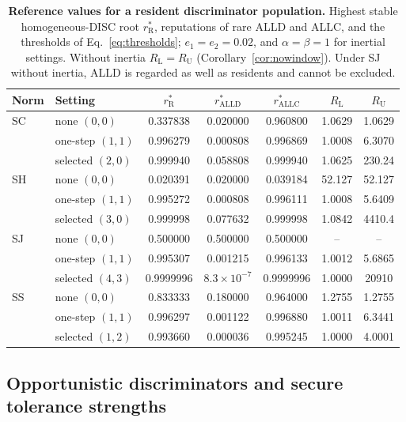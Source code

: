 \documentclass[10pt]{wlscirep}
\newcommand{\rR}{r_{\mathrm{R}}^{*}}
\newcommand{\ALLC}{\mathrm{ALLC}}
\newcommand{\ALLD}{\mathrm{ALLD}}
\theoremstyle{plain}
\theoremstyle{remark}
\begin{document}
\begin{table}[!htbp]
\centering
\caption{\textbf{Reference values for a resident discriminator population.} Highest stable homogeneous-DISC root $\rR$, reputations of rare ALLD and ALLC, and the thresholds of Eq.~\eqref{eq:thresholds}; $e_1=e_2=0.02$, and $\alpha=\beta=1$ for inertial settings. Without inertia $R_{\mathrm L}=R_{\mathrm U}$ (Corollary~\ref{cor:nowindow}). Under SJ without inertia, ALLD is regarded as well as residents and cannot be excluded.}
\label{tab:si-thresholds}
\small
\begin{tabular}{@{}llccccc@{}}
\toprule
Norm & Setting & $\rR$ & $r^*_{\ALLD}$ & $r^*_{\ALLC}$ & $R_{\mathrm L}$ & $R_{\mathrm U}$\\
\midrule
SC & none $(0,0)$ & 0.337838 & 0.020000 & 0.960800 & 1.0629 & 1.0629\\
 & one-step $(1,1)$ & 0.996279 & 0.000808 & 0.996869 & 1.0008 & 6.3070\\
 & selected $(2,0)$ & 0.999940 & 0.058808 & 0.999940 & 1.0625 & 230.24\\
SH & none $(0,0)$ & 0.020391 & 0.020000 & 0.039184 & 52.127 & 52.127\\
 & one-step $(1,1)$ & 0.995272 & 0.000808 & 0.996111 & 1.0008 & 5.6409\\
 & selected $(3,0)$ & 0.999998 & 0.077632 & 0.999998 & 1.0842 & 4410.4\\
SJ & none $(0,0)$ & 0.500000 & 0.500000 & 0.500000 & -- & --\\
 & one-step $(1,1)$ & 0.995307 & 0.001215 & 0.996133 & 1.0012 & 5.6865\\
 & selected $(4,3)$ & 0.9999996 & $8.3\times10^{-7}$ & 0.9999996 & 1.0000 & 20910\\
SS & none $(0,0)$ & 0.833333 & 0.180000 & 0.964000 & 1.2755 & 1.2755\\
 & one-step $(1,1)$ & 0.996297 & 0.001122 & 0.996880 & 1.0011 & 6.3441\\
 & selected $(1,2)$ & 0.993660 & 0.000036 & 0.995245 & 1.0000 & 4.0001\\
\bottomrule
\end{tabular}
\end{table}

\subsection{Opportunistic discriminators and secure tolerance strengths}
\label{si:opportunism}
\end{document}
